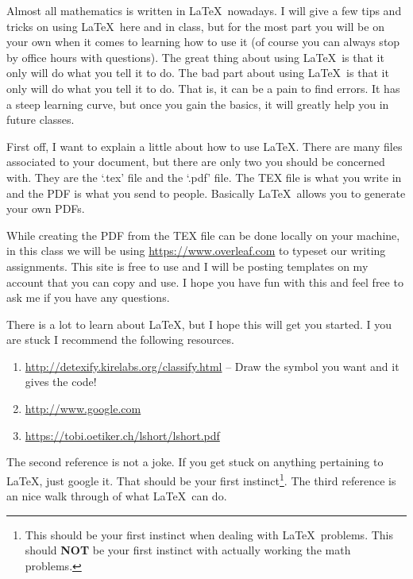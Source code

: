 \documentclass{amsart}
\begin{document}


	

Almost all mathematics is written in \LaTeX\ nowadays. I will give a few tips and tricks on using \LaTeX\ here and in class, but for the most part you will be on your own when it comes to learning how to use it (of course you can always stop by office hours with questions). The great thing about using \LaTeX\ is that it only will do what you tell it to do. The bad part about using \LaTeX\ is that it only will do what you tell it to do. That is, it can be a pain to find errors. It has a steep learning curve, but once you gain the basics, it will greatly help you in future classes. 

First off, I want to explain a little about how to use \LaTeX. There are many files associated to your document, but there are only two you should be concerned with. They are the `.tex' file and the `.pdf' file. The TEX file is what you write in and the PDF is what you send to people.  Basically \LaTeX\ allows you to generate your own PDFs. 

While creating the PDF from the TEX file can be done locally on your machine, in this class we will be using \url{https://www.overleaf.com} to typeset our writing assignments. This site is free to use and I will be posting templates on my account that you can copy and use. I hope you have fun with this and feel free to ask me if you have any questions.

There is a lot to learn about \LaTeX, but I hope this will get you started. I you are stuck I recommend the following resources.
\begin{enumerate}
  \item \url{http://detexify.kirelabs.org/classify.html} -- Draw the symbol you want and it gives the code!
  \item \url{http://www.google.com}
  \item \url{https://tobi.oetiker.ch/lshort/lshort.pdf}
\end{enumerate}
The second reference is not a joke. If you get stuck on anything pertaining to \LaTeX, just google it. That should be your first instinct\footnote{This should be your first instinct when dealing with \LaTeX\ problems. This should {\bf NOT} be your first instinct with actually working the math problems.}. The third reference is an nice walk through of what \LaTeX\ can do. 
\end{document}

